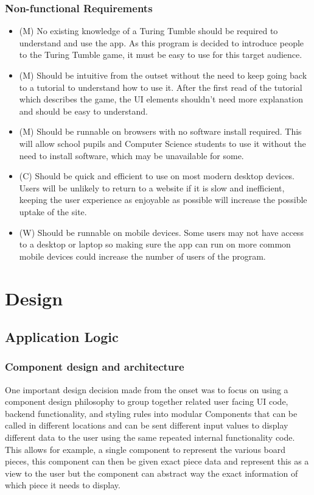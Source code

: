\documentclass{l4proj}
\begin{document}
\subsection{Non-functional Requirements}
\begin{itemize}
    \item (M) No existing knowledge of a Turing Tumble should be required to understand and use the app. As this program is decided to introduce people to the Turing Tumble game, it must be easy to use for this target audience.
    \item (M) Should be intuitive from the outset without the need to keep going back to a tutorial to understand how to use it. After the first read of the tutorial which describes the game, the UI elements shouldn't need more explanation and should be easy to understand.
    \item (M) Should be runnable on browsers with no software install required. This will allow school pupils and Computer Science students to use it without the need to install software, which may be unavailable for some.
    \item (C) Should be quick and efficient to use on most modern desktop devices. Users will be unlikely to return to a website if it is slow and inefficient, keeping the user experience as enjoyable as possible will increase the possible uptake of the site.
    \item (W) Should be runnable on mobile devices. Some users may not have access to a desktop or laptop so making sure the app can run on more common mobile devices could increase the number of users of the program.
\end{itemize}

\chapter{Design}
\section{Application Logic}
\subsection{Component design and architecture}
One important design decision made from the onset was to focus on using a component design philosophy to group together related user facing UI code, backend functionality, and styling rules into modular Components that can be called in different locations and can be sent different input values to display different data to the user using the same repeated internal functionality code. This allows for example, a single component to represent the various board pieces, this component can then be given exact piece data and represent this as a view to the user but the component can abstract way the exact information of which piece it needs to display.
\end{document}
